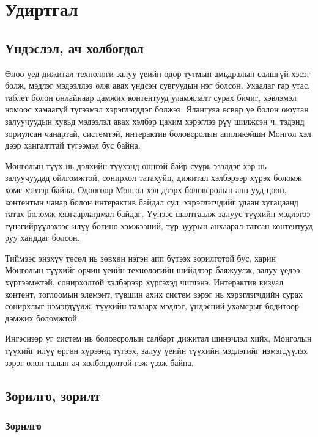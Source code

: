 \newpage
	
	\pagestyle{plain}
	\setcounter{page}{1}
	
	\chapter{Удиртгал}
	\section{Үндэслэл, ач холбогдол}
	
	Өнөө үед дижитал технологи залуу үеийн өдөр тутмын амьдралын салшгүй хэсэг болж, мэдлэг мэдээллээ олж авах үндсэн сувгуудын нэг болсон. Ухаалаг гар утас, таблет болон онлайнаар дамжих контентууд уламжлалт сурах бичиг, хэвлэмэл номоос хамаагүй түгээмэл хэрэглэгддэг болжээ. Ялангуяа өсвөр үе болон оюутан залуучуудын хувьд мэдээлэл авах хэлбэр цахим хэрэглээ рүү шилжсэн ч, тэдэнд зориулсан чанартай, системтэй, интерактив боловсролын аппликэйшн Монгол хэл дээр хангалттай түгээмэл бус байна.

Монголын түүх нь дэлхийн түүхэнд онцгой байр суурь эзэлдэг хэр нь залуучуудад ойлгомжтой, сонирхол татахуйц, дижитал хэлбэрээр хүрэх боломж хомс хэвээр байна. Одоогоор Монгол хэл дээрх боловсролын апп-ууд цөөн, контентын чанар болон интерактив байдал сул, хэрэглэгчдийг удаан хугацаанд татах боломж хязгаарлагдмал байдаг. Үүнээс шалтгаалж залуус түүхийн мэдлэгээ гүнзгийрүүлэхээс илүү богино хэмжээний, түр зуурын анхаарал татсан контентууд руу ханддаг болсон.

Тиймээс энэхүү төсөл нь зөвхөн нэгэн апп бүтээх зорилготой бус, харин Монголын түүхийг орчин үеийн технологийн шийдлээр баяжуулж, залуу үедээ хүртээмжтэй, сонирхолтой хэлбэрээр хүргэхэд чиглэнэ. Интерактив визуал контент, тоглоомын элемэнт, түвшин ахих систем зэрэг нь хэрэглэгчдийн сурах сонирхлыг нэмэгдүүлж, түүхийн талаарх мэдлэг, үндэсний ухамсрыг бодитоор дэмжих боломжтой.

Ингэснээр уг систем нь боловсролын салбарт дижитал шинэчлэл хийх, Монголын түүхийг илүү өргөн хүрээнд түгээх, залуу үеийн түүхийн мэдлэгийг нэмэгдүүлэх зэрэг олон талын ач холбогдолтой гэж үзэж байна.
	
	\section{Зорилго, зорилт}
	
	\subsection*{Зорилго}
	
